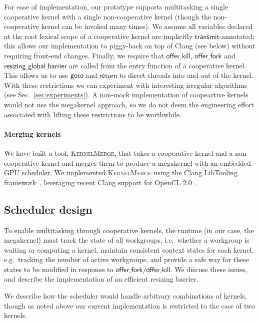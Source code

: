 \documentclass[numbers,nocopyrightspace,10pt]{sigplanconf}
\newcommand{\kernelmerge}{\textsc{KernelMerge}}
\newcommand{\mysec}{Sec.~}
\newcommand{\transmit}{\mathsf{transmit}}
\newcommand{\offerfork}{\mathsf{offer\_fork}}
\newcommand{\offerkill}{\mathsf{offer\_kill}}
\newcommand{\resizingglobalbarrier}{\mathsf{resizing\_global\_barrier}}
\newcommand{\keyword}[1]{\mathsf{#1}}
\begin{document}
For ease of implementation, our prototype supports
multitasking a single cooperative kernel with a single non-cooperative
kernel (though the non-cooperative kernel can be invoked many times).
We
assume all variables declared at the root lexical scope of a
cooperative kernel are implicitly $\transmit$-annotated; this allows our
implementation to piggy-back on top of Clang (see below) without
requiring front-end changes.  Finally, we require that $\offerkill$,
$\offerfork$ and $\resizingglobalbarrier$ are called from the entry
function of a cooperative kernel.  This allows us to use
$\keyword{goto}$ and $\keyword{return}$ to direct threads into and out
of the kernel.  With these restrictions we can experiment
with interesting irregular algorithms (see
\mysec\ref{sec:experiments}).  A non-mock implementation of
coopeartive kernels would not use the megakernel approach, so we do not deem
the engineering effort associated with lifting these restrictions to
be worthwhile.

\paragraph{Merging kernels}

We have built a tool, \kernelmerge{}, that takes a cooperative kernel
and a non-cooperative kernel and merges them to produce a megakernel
with an embedded GPU scheduler.  We implemented \kernelmerge{} using the
Clang LibTooling framework~\cite{clang}, leveraging recent Clang support
for OpenCL 2.0~\cite{ClangOpenCL20}.

\subsection{Scheduler design}\label{sec:resizingbarrier}\label{sec:schedulerimpl}

To enable multitasking through cooperative kernels, the runtime (in
our case, the megakernel) must track the state of all
workgroups, i.e.\ whether a workgroup is waiting or computing a kernel,
maintain consistent context states for each kernel, e.g.\ tracking the number
of active workgroups, and provide a
safe way for these states to be modified in response to $\offerfork$/$\offerkill$. We discuss these issues,
and describe the implementation of an efficient resizing barrier.

We describe how the scheduler would handle arbitrary
combinations of kernels, though as noted above our current
implementation is restricted to the case of two kernels.
\end{document}
